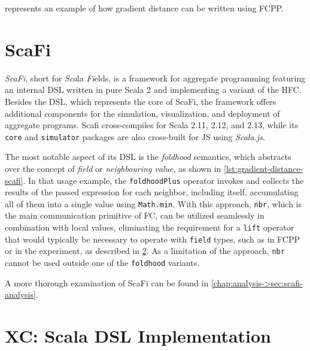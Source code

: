  represents an example of how gradient distance can be written using FCPP.




\section{ScaFi} \label{chap:state-of-the-art->sec:scafi}

\textit{ScaFi}, short for \textit{Sca}la \textit{Fi}elds, is a framework for aggregate programming featuring an internal \ac{DSL} written in pure Scala 2\cite{scafi} and implementing a variant of the \ac{HFC}.
%
Besides the \ac{DSL}, which represents the core of ScaFi, the framework offers additional components for the simulation, visualization, and deployment of aggregate programs.
%
Scafi cross-compiles for Scala 2.11, 2.12, and 2.13, while its \texttt{core} and \texttt{simulator} packages are also cross-built for \ac{JS} using \textit{Scala.js}\cite{scala-js}.

The most notable aspect of its \ac{DSL} is the \textit{foldhood} semantics, which abstracts over the concept of \textit{field} or \textit{neighbouring value}, as shown in \cref{lst:gradient-distance-scafi}.
%
In that usage example, the \texttt{foldhoodPlus} operator invokes and collects the results of the passed expression for each neighbor, including itself, accumulating all of them into a single value using \texttt{Math.min}.
%
With this approach, \texttt{nbr}, which is the main communication primitive of \ac{FC}, can be utilized seamlessly in combination with local values, eliminating the requirement for a \texttt{lift} operator that would typically be necessary to operate with \texttt{field} types, such as in FCPP or in the  experiment, as described in \cref{chap:state-of-the-art->sec:xc-experiment}.
%
As a limitation of the approach, \texttt{nbr} cannot be used outside one of the \texttt{foldhood} variants.



A more thorough examination of ScaFi can be found in \cref{chap:analysis->sec:scafi-analysis}.

\section{XC: Scala DSL Implementation} \label{chap:state-of-the-art->sec:xc-experiment}


